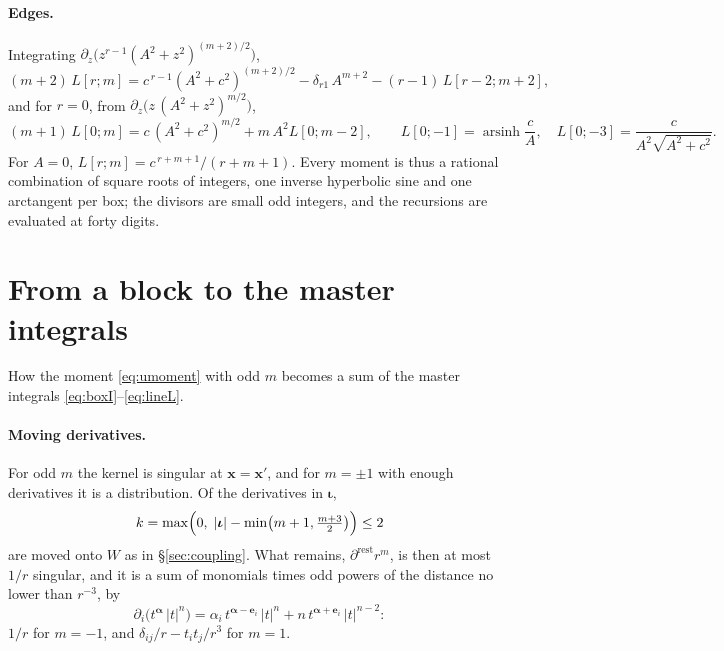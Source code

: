 \documentclass[11pt,a4paper]{article}
\begin{document}
\paragraph{Edges.} Integrating $\partial_z\bigl(z^{r-1}(A^2+z^2)^{(m+2)/2}\bigr)$,
\begin{equation}\label{eq:linerec}
  (m+2)\,L[r;m]=c^{\,r-1}(A^2+c^2)^{(m+2)/2}-\delta_{r1}\,A^{m+2}-(r-1)\,L[r-2;m+2],
\end{equation}
and for $r=0$, from $\partial_z\bigl(z\,(A^2+z^2)^{m/2}\bigr)$,
\begin{equation}\label{eq:line0}
  (m+1)\,L[0;m]=c\,(A^2+c^2)^{m/2}+m\,A^2L[0;m-2],\qquad
  L[0;-1]=\operatorname{arsinh}\frac cA,\quad L[0;-3]=\frac{c}{A^2\sqrt{A^2+c^2}}.
\end{equation}
For $A=0$, $L[r;m]=c^{\,r+m+1}/(r+m+1)$. Every moment is thus a rational combination of square roots of
integers, one inverse hyperbolic sine and one arctangent per box; the divisors are small odd integers, and
the recursions are evaluated at forty digits.

\section{From a block to the master integrals}\label{app:pieces}

How the moment \eqref{eq:umoment} with odd $m$ becomes a sum of the master integrals
\eqref{eq:boxI}--\eqref{eq:lineL}.

\paragraph{Moving derivatives.} For odd $m$ the kernel is
singular at $\mathbf{x}=\mathbf{x}'$, and for $m=\pm1$ with enough derivatives it is a distribution. Of the
derivatives in $\boldsymbol\iota$,
\begin{equation}\label{eq:moves}
  k=\max\Bigl(0,\;|\boldsymbol\iota|-\min\bigl(m+1,\tfrac{m+3}{2}\bigr)\Bigr)\le2
\end{equation}
are moved onto $W$ as in \S\ref{sec:coupling}. What remains, $\partial^{\text{rest}}r^m$, is then at most
$1/r$ singular, and it is a sum of monomials times odd powers of the distance no lower than $r^{-3}$, by
\begin{equation}\label{eq:monomials}
  \partial_i\bigl(t^{\boldsymbol\alpha}\,|t|^{n}\bigr)
  =\alpha_i\,t^{\boldsymbol\alpha-\mathbf{e}_i}\,|t|^{n}+n\,t^{\boldsymbol\alpha+\mathbf{e}_i}\,|t|^{n-2}:
\end{equation}
$1/r$ for $m=-1$, and $\delta_{ij}/r-t_it_j/r^3$ for $m=1$.
\end{document}
